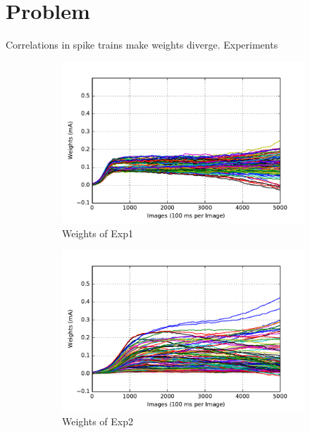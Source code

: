 \section{Problem}
\label{sec:problem}
Correlations in spike trains make weights diverge.
Experiments
\begin{figure}
	\centering
	\begin{subfigure}[t]{0.4\textwidth}
		\includegraphics[width=\textwidth]{pics_sdlm/00_exp_SAE_Orig/exp1_weights_s.pdf}
		\caption{Weights of Exp1}
	\end{subfigure}
	\begin{subfigure}[t]{0.4\textwidth}
		\includegraphics[width=\textwidth]{pics_sdlm/00_exp_SAE_Orig/exp2_weights_s.pdf}
		\caption{Weights of Exp2}
	\end{subfigure}
	\begin{subfigure}[t]{0.4\textwidth}

\end{subfigure}
\end{figure}
